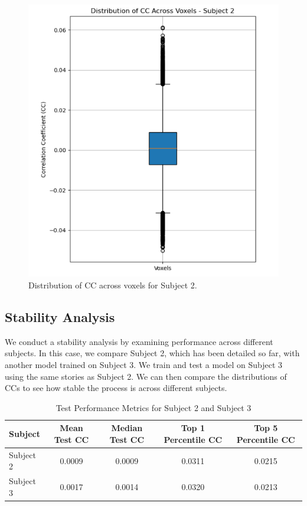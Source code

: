 \documentclass[10pt,letterpaper]{article}
\begin{document}
\begin{figure}
    \centering
    \includegraphics[width=0.5\linewidth]{figs/cc_dist_voxels_subject_2.png}
    \caption{Distribution of CC across voxels for Subject 2.}
    \label{fig:cc_dist_voxels_subject_2}
\end{figure}


\subsection{Stability Analysis}
We conduct a stability analysis by examining performance across different subjects. In this case, we compare Subject 2, which has been detailed so far, with another model trained on Subject 3. We train and test a model on Subject 3 using the same stories as Subject 2. We can then compare the distributions of CCs to see how stable the process is across different subjects.

\begin{table}[ht]
  \centering
  \caption{Test Performance Metrics for Subject 2 and Subject 3}
  \label{tab:subject_performance}
  \begin{tabular}{lcccc}
    \hline
    \textbf{Subject} & \textbf{Mean Test CC} & \textbf{Median Test CC} & \textbf{Top 1 Percentile CC} & \textbf{Top 5 Percentile CC} \\
    \hline
    Subject 2        & 0.0009                & 0.0009                 & 0.0311                     & 0.0215                      \\
    Subject 3        & 0.0017                & 0.0014                 & 0.0320                     & 0.0213                      \\
    \hline
  \end{tabular}
\end{table}
\end{document}
